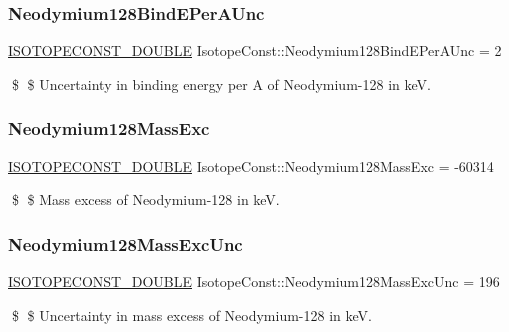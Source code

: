 \subsubsection{\texorpdfstring{Neodymium128\+Bind\+E\+Per\+A\+Unc}{Neodymium128BindEPerAUnc}}
{\footnotesize\ttfamily \mbox{\hyperlink{group___isotope_const-_macros_ga8f45a7272ce02c0b4c65c44636ed719a}{I\+S\+O\+T\+O\+P\+E\+C\+O\+N\+S\+T\+\_\+\+D\+O\+U\+B\+LE}} Isotope\+Const\+::\+Neodymium128\+Bind\+E\+Per\+A\+Unc = 2}

\$ \$ Uncertainty in binding energy per A of Neodymium-\/128 in keV. \mbox{\label{group___isotope_const-_neodymium-_nd128_ga3629c31ddd5c75641a0aafa8b78a7db3}} 
\subsubsection{\texorpdfstring{Neodymium128\+Mass\+Exc}{Neodymium128MassExc}}
{\footnotesize\ttfamily \mbox{\hyperlink{group___isotope_const-_macros_ga8f45a7272ce02c0b4c65c44636ed719a}{I\+S\+O\+T\+O\+P\+E\+C\+O\+N\+S\+T\+\_\+\+D\+O\+U\+B\+LE}} Isotope\+Const\+::\+Neodymium128\+Mass\+Exc = -\/60314}

\$ \$ Mass excess of Neodymium-\/128 in keV. \mbox{\label{group___isotope_const-_neodymium-_nd128_gab25dffe500787673147b7583af666921}} 
\subsubsection{\texorpdfstring{Neodymium128\+Mass\+Exc\+Unc}{Neodymium128MassExcUnc}}
{\footnotesize\ttfamily \mbox{\hyperlink{group___isotope_const-_macros_ga8f45a7272ce02c0b4c65c44636ed719a}{I\+S\+O\+T\+O\+P\+E\+C\+O\+N\+S\+T\+\_\+\+D\+O\+U\+B\+LE}} Isotope\+Const\+::\+Neodymium128\+Mass\+Exc\+Unc = 196}

\$ \$ Uncertainty in mass excess of Neodymium-\/128 in keV. \mbox{\label{group___isotope_const-_neodymium-_nd128_ga1f0d41cbdff27d37272df1147b207374}} 
